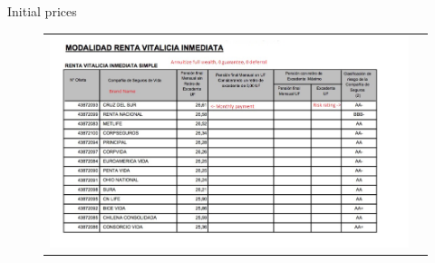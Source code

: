 \documentclass[10pt,aspectratio=169]{beamer}
\begin{document}
\begin{frame}{Initial prices}\label{slide:fig5}    
\begin{figure}[H]
\centering{}%
\begin{tabular}{cc}
\includegraphics[scale=0.49]{../figures/annuity_offer.png}
\end{tabular}
\end{figure}
\hyperlink{slide:setting}{}
\end{frame}
\end{document}
